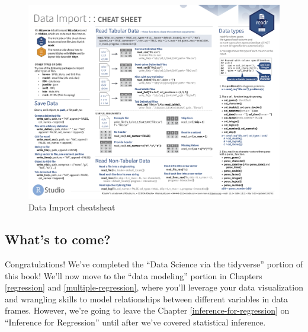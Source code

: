 \documentclass[12pt, krantz2,]{krantz}
\begin{document}
\begin{figure}

{\centering \includegraphics[width=\textwidth]{images/import_cheatsheet-1} 

}

\caption{Data Import cheatsheat}\label{fig:import-cheatsheet}
\end{figure}

\hypertarget{whats-to-come-2}{%
\subsection{What's to come?}\label{whats-to-come-2}}

Congratulations! We've completed the ``Data Science via the tidyverse'' portion of this book! We'll now move to the ``data modeling'' portion in Chapters \ref{regression} and \ref{multiple-regression}, where you'll leverage your data visualization and wrangling skills to model relationships between different variables in data frames. However, we're going to leave the Chapter \ref{inference-for-regression} on ``Inference for Regression'' until after we've covered statistical inference.
\end{document}
